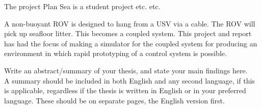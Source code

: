 The project Plan Sea is a student project etc. etc.

A non-buoyant ROV is designed to hang from a USV via a cable. The ROV will pick up seafloor litter. This becomes a coupled system. This project and report has had the focus of making a simulator for the coupled system for producing an environment in which rapid prototyping of a control system is possible. 


Write an abstract/summary of your thesis, and state your main findings here. \\

\noindent A summary should be included in both English and any second language, if this is applicable, regardless if the thesis is written in English or in your preferred language. These should be on separate pages, the English version first.







